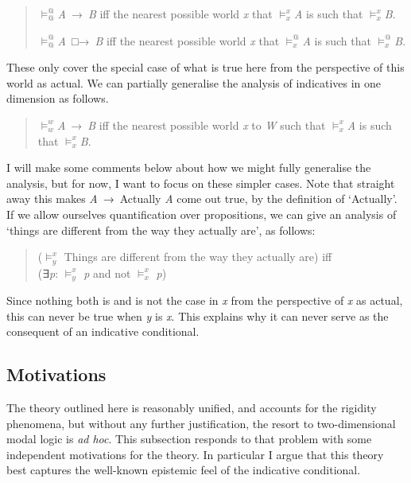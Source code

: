 \documentclass[
  11pt,
  letterpaper,
  DIV=11,
  numbers=noendperiod,
  twoside]{scrartcl}
\begin{document}
\begin{quote}
\(\vDash_@^@\)\emph{A}~→~\emph{B} iff the nearest possible world
\emph{x} that \(\vDash_x^x\)\emph{A} is such that
\(\vDash_x^x\)\emph{B}.

\(\vDash_@^@\)\emph{A}~□→~\emph{B} iff the nearest possible world
\emph{x} that \(\vDash_x^@\)\emph{A} is such that
\(\vDash_x^@\)\emph{B}.
\end{quote}

These only cover the special case of what is true here from the
perspective of this world as actual. We can partially generalise the
analysis of indicatives in one dimension as follows.

\begin{quote}
\(\vDash_w^w\)\emph{A}~→~\emph{B} iff the nearest possible world
\emph{x} to \emph{W} such that \(\vDash_x^x\)\emph{A} is such that
\(\vDash_x^x\)\emph{B}.
\end{quote}

I will make some comments below about how we might fully generalise the
analysis, but for now, I want to focus on these simpler cases. Note that
straight away this makes \emph{A}~→~Actually \emph{A} come out true, by
the definition of `Actually'. If we allow ourselves quantification over
propositions, we can give an analysis of `things are different from the
way they actually are', as follows:

\begin{quote}
(\(\vDash_y^x\) Things are different from the way they actually are)
iff\\
(∃\emph{p}: \(\vDash_y^x\) \emph{p} and not \(\vDash_x^x\) \emph{p})
\end{quote}

Since nothing both is and is not the case in \emph{x} from the
perspective of \emph{x} as actual, this can never be true when \emph{y}
is \emph{x}. This explains why it can never serve as the consequent of
an indicative conditional.

\subsection{Motivations}\label{motivations}

The theory outlined here is reasonably unified, and accounts for the
rigidity phenomena, but without any further justification, the resort to
two-dimensional modal logic is \emph{ad hoc}. This subsection responds
to that problem with some independent motivations for the theory. In
particular I argue that this theory best captures the well-known
epistemic feel of the indicative conditional.
\end{document}
